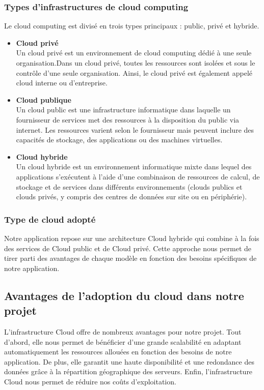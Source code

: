 \subsubsection{Types d'infrastructures de cloud computing}
\justifying
Le cloud computing est divisé en trois types principaux : public, privé et hybride.
\begin{itemize}[itemsep=2pt, parsep=2pt]
    \item \textbf{Cloud privé}\\ Un cloud privé est un environnement de cloud computing dédié à une seule organisation.Dans un cloud privé, toutes les ressources sont isolées et sous le contrôle d'une seule organisation. Ainsi, le cloud privé est également appelé cloud interne ou d'entreprise. \cite{cloudPrivé}
    \item \textbf{Cloud publique}\\ Un cloud public est une infrastructure informatique dans laquelle un fournisseur de services met des ressources à la disposition du public via internet. Les ressources varient selon le fournisseur mais peuvent inclure des capacités de stockage, des applications ou des machines virtuelles. \cite{CloudPublique}
    \item \textbf{Cloud hybride}\\ Un cloud hybride est un environnement informatique mixte dans lequel des applications s'exécutent à l'aide d'une combinaison de ressources de calcul, de stockage et de services dans différents environnements (clouds publics et clouds privés, y compris des centres de données sur site ou en périphérie). \cite{CloudHybride}
\end{itemize}

\subsubsection{Type de cloud adopté }
\justifying
Notre application repose sur une architecture Cloud hybride qui combine à la fois des services de Cloud public et de Cloud privé. Cette approche nous permet de tirer parti des avantages de chaque modèle en fonction des besoins spécifiques de notre application. 

\subsection{Avantages de l’adoption du cloud dans notre projet}
\justifying
L'infrastructure Cloud offre de nombreux avantages pour notre projet. Tout d'abord, elle nous permet de bénéficier d'une grande scalabilité en adaptant automatiquement les ressources allouées en fonction des besoins de notre application. De plus, elle garantit une haute disponibilité et une redondance des données grâce à la répartition géographique des serveurs. Enfin, l'infrastructure Cloud nous permet de réduire nos coûts d'exploitation. 

